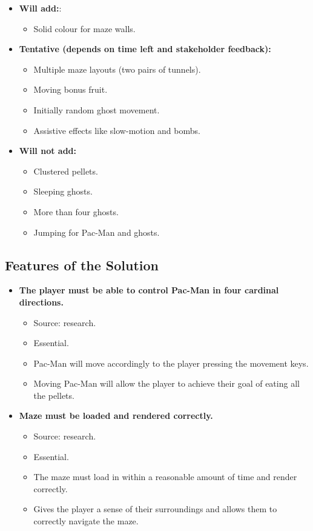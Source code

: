\documentclass[letterpaper, 11pt]{article}
\begin{document}
\begin{itemize}
\item \textbf{Will add:}:
\begin{itemize}
\item Solid colour for maze walls.
\end{itemize}

\item \textbf{Tentative (depends on time left and stakeholder feedback):}
\begin{itemize}
\item Multiple maze layouts (two pairs of tunnels).
\item Moving bonus fruit.
\item Initially random ghost movement.
\item Assistive effects like slow-motion and bombs.
\end{itemize}

\item \textbf{Will not add:}
\begin{itemize}
\item Clustered pellets.
\item Sleeping ghosts.
\item More than four ghosts.
\item Jumping for Pac-Man and ghosts.
\end{itemize}
\end{itemize}

\subsection{Features of the Solution}
\label{sec:org173e079}
\begin{itemize}
\item \textbf{The player must be able to control Pac-Man in four cardinal directions.}
\begin{itemize}
\item Source: research.
\item Essential.
\item Pac-Man will move accordingly to the player pressing the movement keys.
\item Moving Pac-Man will allow the player to achieve their goal of eating all the pellets.
\end{itemize}
\end{itemize}


\begin{itemize}
\item \textbf{Maze must be loaded and rendered correctly.}
\begin{itemize}
\item Source: research.
\item Essential.
\item The maze must load in within a reasonable amount of time and render correctly.
\item Gives the player a sense of their surroundings and allows them to correctly navigate the maze.
\end{itemize}
\end{itemize}
\end{document}
